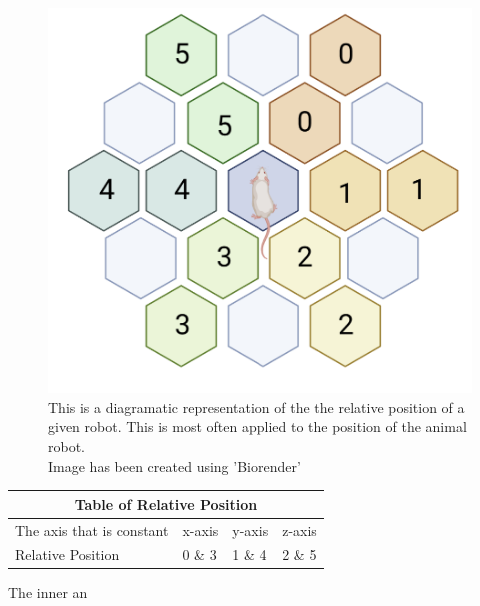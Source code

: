 \begin{figure}
    \centering
    \includegraphics[scale = 0.5 ]{images/relative_position.png}
    \caption{This is a diagramatic representation of the the relative position of a given robot. This is most often applied to the position of the animal robot. 
    \\ Image has been created using 'Biorender' \cite{biorender}}
    \label{fig:relative_position}
\end{figure}

\begin{tabular}{|p{3cm}||p{3cm}|p{3cm}|p{3cm}|}
 \hline
 \multicolumn{4}{|c|}{Table of Relative Position} \\
 \hline
 The axis that is constant & x-axis & y-axis & z-axis \\
 \hline
Relative Position    & 0 \&  3 & 1 \& 4 & 2 \& 5 \\

 \hline
\end{tabular}


The inner an

